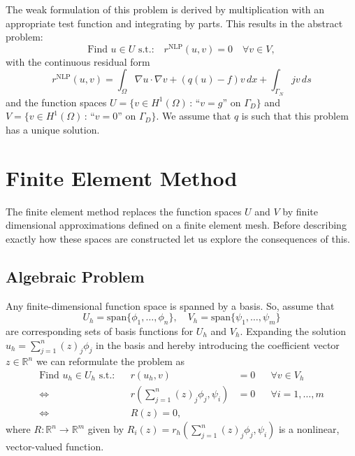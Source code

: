 \documentclass[a4paper,12pt]{article}
\begin{document}
The weak formulation of this problem is derived by multiplication with an appropriate
test function and integrating by parts. This results in the abstract problem:
\begin{equation}
\text{Find $u\in U$ s.t.:} \quad r^{\text{NLP}}(u,v)=0 \quad \forall v\in V,
\label{Eq:BasicBuildingBlock}
\end{equation}
with the continuous residual form
\begin{equation*}
r^{\text{NLP}}(u,v) = \int_\Omega \nabla u \cdot \nabla v + (q(u)-f)v\,dx + \int_{\Gamma_N} jv\,ds
\label{eq:ResidualForm}
\end{equation*}
and the function spaces 
$U= \{v\in H^1(\Omega) \,:\, \text{``$v=g$'' on $\Gamma_D$}\}$
and $V= \{v\in H^1(\Omega) \,:\, \text{``$v=0$'' on $\Gamma_D$}\}$. 
We assume that $q$ is such that this problem has a unique solution.

\section{Finite Element Method}

The finite element method \cite{WHElliptisch,Brenner,Eriksson,Ciarlet,Braess,Ern,Elman2005} 
replaces the function spaces $U$ and $V$ by
finite dimensional approximations defined on a finite element mesh.
Before describing exactly how these spaces are constructed let us
explore the consequences of this.

\subsection{Algebraic Problem}

Any finite-dimensional function space is spanned by a basis. So, assume that
\begin{equation*}
U_h=\text{span}\{\phi_1,\ldots,\phi_n\}, \quad V_h=\text{span}\{\psi_1,\ldots,\psi_m\}
\end{equation*}
are corresponding sets of basis functions for $U_h$ and $V_h$.
Expanding the solution $u_h=\sum_{j=1}^n (z)_j\phi_j$ in the basis and
hereby introducing the coefficient vector $z\in\mathbb{R}^n$ we can
reformulate the problem as
\begin{align*}
\text{Find $u_h\in U_h$ s.t.:} && r(u_h,v)&=0 && \forall v\in V_h\\
\Leftrightarrow{} && r\left(\sum_{j=1}^n (z)_j\phi_j,\psi_i\right) &= 0 &&\forall i=1,\ldots,m\\
\Leftrightarrow{} && R(z) = 0,
\end{align*}
where $R: \mathbb{R}^n \to \mathbb{R}^m$ given by 
$R_i(z) = r_h\left(\sum_{j=1}^n (z)_j\phi_j,\psi_i\right)$ is a nonlinear, vector-valued function.
\end{document}
